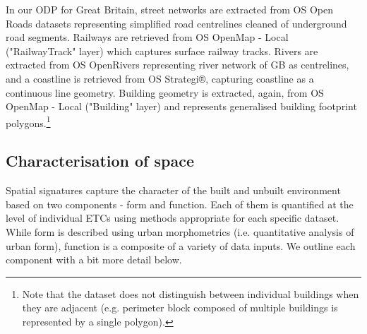\documentclass[fleqn,10pt]{wlscirep}
\begin{document}
In our ODP for Great Britain, street networks are extracted from OS
Open Roads datasets\cite{openroads2020} representing simplified road centrelines
cleaned of underground road segments.
Railways are retrieved from OS OpenMap - Local\cite{openmap2020}
("RailwayTrack" layer) which captures surface railway tracks. Rivers are extracted from
OS OpenRivers\cite{openrivers2020} representing river network of GB as centrelines, and a coastline is
retrieved from OS Strategi®\cite{strategi2016}, capturing coastline as a continuous line
geometry. Building geometry is extracted, again, from OS OpenMap - Local ("Building"
layer) and represents generalised building footprint polygons.\footnote{Note that the dataset
does not distinguish between individual buildings when they are adjacent (e.g. perimeter
block composed of multiple buildings is represented by a single polygon).}

\subsection*{Characterisation of space}
Spatial signatures capture the character of the built and unbuilt environment
based on two components - form and function. Each of them is quantified at the level of
individual ETCs using methods appropriate for each specific dataset. While form
is described using urban morphometrics (i.e. quantitative analysis of urban
form)\cite{dibble2019origin}, function is a composite of a variety of data inputs. We outline each
component with a bit more detail below.
\end{document}
